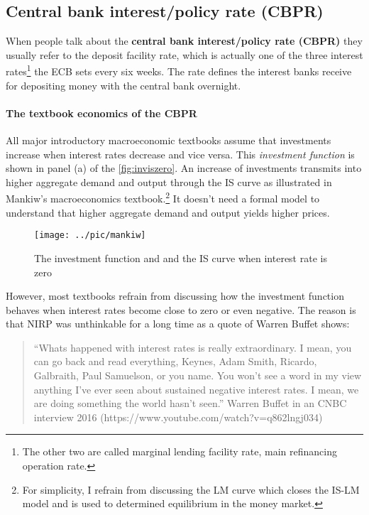 \subsection{Central bank interest/policy rate (CBPR)}

When people talk about the \textbf{central bank interest/policy rate (CBPR)} they usually refer to the deposit facility rate, which is actually one of the three interest rates\footnote{The other two are called marginal lending facility rate, main refinancing operation rate.} the ECB sets every six weeks. The rate defines the interest banks receive for depositing money with the central bank overnight. 


\paragraph{The textbook economics of the CBPR}
All major introductory macroeconomic textbooks assume that investments increase when interest rates decrease and vice versa. This \textit{investment function} is shown in panel (a) of the \autoref{fig:inviszero}. An increase of investments transmits into higher aggregate demand and output through the IS curve as illustrated in Mankiw's macroeconomics textbook.\footnote{For simplicity, I refrain from discussing the LM curve which closes the IS-LM model and  is used to determined equilibrium in the money market.} It doesn't need a formal model to understand that higher aggregate demand and output yields higher prices.

\begin{figure}
	\begin{center}
		\texttt{[image: ../pic/mankiw]}
	\end{center}
	\caption{The investment function and and the IS curve when interest rate is zero}\label{fig:inviszero}
\end{figure}


However, most textbooks refrain from discussing how the investment function behaves when interest rates become close to zero or even negative. The reason is that NIRP was unthinkable for a long time as a quote of Warren Buffet shows:

\begin{quotation}
``Whats happened with interest rates is really extraordinary. I mean, you can go back and read everything, Keynes, Adam Smith, Ricardo, Galbraith, Paul Samuelson, or you name. You won't see a word in my view anything I've ever seen about sustained negative interest rates. I mean, we are doing something the world hasn't seen.'' Warren Buffet in an CNBC interview 2016 (https://www.youtube.com/watch?v=q862lngj034)
\end{quotation} 


